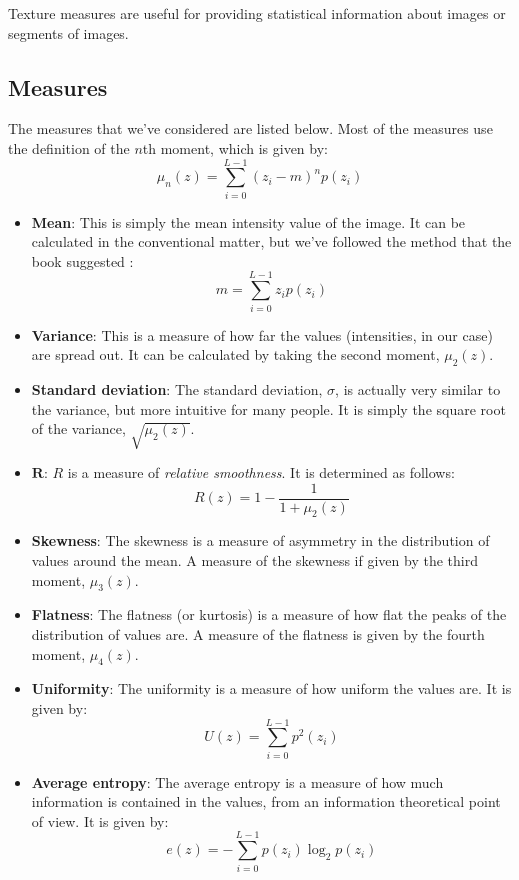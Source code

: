 Texture measures are useful for providing statistical information about images or segments of images.

\subsection*{Measures}
The measures that we've considered are listed below.
Most of the measures use the definition of the \(n\)th moment, which is given by\cite[Eq. 11.3-4]{gonzalez2002digital}:
\[
	\mu_n(z) = 
	\sum_{i=0}^{L-1}(z_i - m)^n p(z_i)
\]
\begin{itemize}
	\item \textbf{Mean}:
	This is simply the mean intensity value of the image. It can be calculated in the conventional matter, but we've followed the method that the book suggested \cite[Eq. 11.3-5]{gonzalez2002digital}:
	\[
		m = 
		\sum_{i=0}^{L-1}z_i p(z_i)
	\]
	
	\item \textbf{Variance}:
	This is a measure of how far the values (intensities, in our case) are spread out.
	It can be calculated by taking the second moment, \(\mu_2(z)\).
	
	\item \textbf{Standard deviation}:
	The standard deviation, \(\sigma\), is actually very similar to the variance, but more intuitive for many people.
	It is simply the square root of the variance, \(\sqrt{\mu_2(z)}\).

	\item \(\mathbf{R}\):
	\(R\) is a measure of \emph{relative smoothness}.
	It is determined as follows:
	\[
	R(z) = 
	1 - \frac{1}{1 + \mu_2(z)}
	\]
	
	\item \textbf{Skewness}:
	The skewness is a measure of asymmetry in the distribution of values around the mean.
	A measure of the skewness if given by the third moment, \(\mu_3(z)\).

	\item \textbf{Flatness}:
	The flatness (or kurtosis) is a measure of how flat the peaks of the distribution of values are.
	A measure of the flatness is given by the fourth moment, \(\mu_4(z)\).

	\item \textbf{Uniformity}:
	The uniformity is a measure of how uniform the values are.
	It is given by\cite[Eq. 11.3-8]{gonzalez2002digital}:
	\[
		U(z) = \sum_{i=0}^{L-1}p^2(z_i)
	\]

	\item \textbf{Average entropy}:
	The average entropy is a measure of how much information is contained in the values, from an information theoretical point of view.
	It is given by\cite[Eq. 11.3-9]{gonzalez2002digital}:
	\[
		e(z) = -\sum_{i=0}^{L-1}p(z_i)\log_2 p(z_i)
	\]
\end{itemize}

